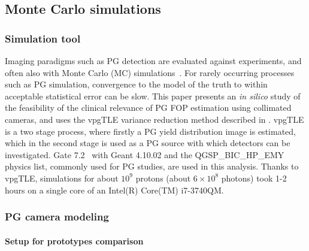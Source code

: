 \documentclass[a4paper,english]{article}
\begin{document}
\subsection{Monte Carlo simulations}\label{sec:MC}

\subsubsection{Simulation tool}

Imaging paradigms such as PG detection are evaluated against experiments, and often also with Monte Carlo (MC) simulations~\citep{Moteabbed2011,Gueth2013,Robert2013,Golnik2014a,Janssen2014}. For rarely occurring processes such as PG simulation, convergence to the model of the truth to within acceptable statistical error can be slow. This paper presents an \emph{in silico} study of the feasibility of the clinical relevance of PG FOP estimation using collimated cameras, and uses the vpgTLE variance reduction method described in \cite{Huisman2016}. vpgTLE is a two stage process, where firstly a PG yield distribution image is estimated, which in the second stage is used as a PG source with which detectors can be investigated. Gate 7.2~\citep{Sarrut2014} with Geant 4.10.02 and the QGSP\_BIC\_HP\_EMY physics list, commonly used for PG studies, are used in this analysis. Thanks to vpgTLE, simulations for about $10^9$ protons (about $6\times10^8$ photons) took 1-2 hours on a single core of an Intel(R) Core(TM) i7-3740QM.

\subsubsection{PG camera modeling}\label{sec:camera}

	
\paragraph{Setup for prototypes comparison}
\end{document}
